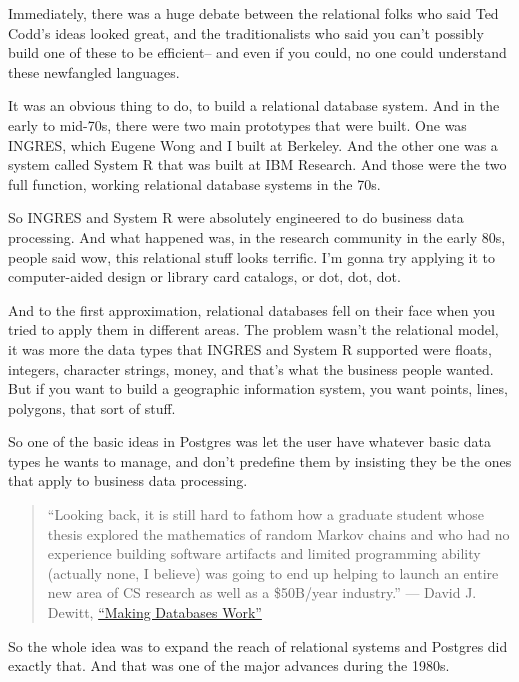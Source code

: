 \documentclass[a4paper,12pt,notitlepage,twoside,openright]{article}
\begin{document}
Immediately, there was a huge debate between the relational folks who
said Ted Codd's ideas looked great, and the traditionalists who said you
can't possibly build one of these to be efficient-- and even if you
could, no one could understand these newfangled languages.

It was an obvious thing to do, to build a relational database system.
And in the early to mid-70s, there were two main prototypes that were
built. One was INGRES, which Eugene Wong and I built at Berkeley. And
the other one was a system called System R that was built at IBM
Research. And those were the two full function, working relational
database systems in the 70s.

So INGRES and System R were absolutely engineered to do business data
processing. And what happened was, in the research community in the
early 80s, people said wow, this relational stuff looks terrific. I'm
gonna try applying it to computer-aided design or library card catalogs,
or dot, dot, dot.

And to the first approximation, relational databases fell on their face
when you tried to apply them in different areas. The problem wasn't the
relational model, it was more the data types that INGRES and System R
supported were floats, integers, character strings, money, and that's
what the business people wanted. But if you want to build a geographic
information system, you want points, lines, polygons, that sort of
stuff.

So one of the basic ideas in Postgres was let the user have whatever
basic data types he wants to manage, and don't predefine them by
insisting they be the ones that apply to business data processing.

\begin{quote}
``Looking back, it is still hard to fathom how a graduate student whose
thesis explored the mathematics of random Markov chains and who had no
experience building software artifacts and limited programming ability
(actually none, I believe) was going to end up helping to launch an
entire new area of CS research as well as a \$50B/year industry.'' ---
David J. Dewitt,
\href{https://www.amazon.com/Making-Databases-Work-Pragmatic-Stonebraker/dp/1947487167/ref=sr_1_1?ie=UTF8\&qid=1549040750\&sr=8-1\&keywords=\%22Making+Databases+Work\%22}{{``Making
Databases Work''}}
\end{quote}

So the whole idea was to expand the reach of relational systems and
Postgres did exactly that. And that was one of the major advances during
the 1980s.
\end{document}

